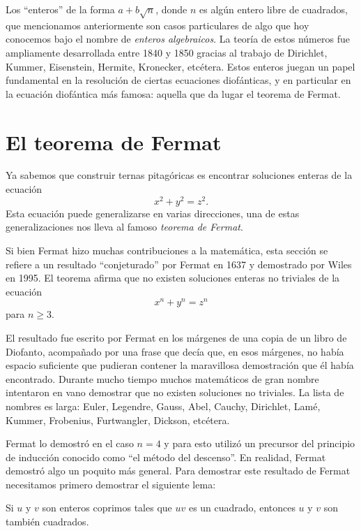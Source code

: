 Los ``enteros'' de la forma $a+b\sqrt{n}$, donde $n$ es algún entero libre de
cuadrados, que mencionamos anteriormente son casos particulares de algo que hoy
conocemos bajo el nombre de \emph{enteros algebraicos}. La teoría de estos
números fue ampliamente desarrollada entre 1840 y 1850 gracias al trabajo de
Dirichlet, Kummer, Eisenstein, Hermite, Kronecker, etcétera. Estos enteros juegan un
papel fundamental en la resolución de ciertas ecuaciones diofánticas, y en
particular en la ecuación diofántica más famosa: aquella que da lugar el
teorema de Fermat.

\section*{El teorema de Fermat}

Ya sabemos que construir ternas pitagóricas es encontrar
soluciones enteras de la ecuación 
\[
	x^2+y^2=z^2.
\]
Esta ecuación puede generalizarse en varias direcciones, una de estas
generalizaciones nos lleva al famoso \emph{teorema de Fermat}.  

Si bien Fermat
hizo muchas contribuciones a la matemática, esta sección se refiere a un
resultado ``conjeturado'' por Fermat en 1637 y demostrado por Wiles en 1995. El
teorema afirma que no existen soluciones enteras no triviales de la ecuación
\[
	x^n+y^n=z^n
\]
para $n\geq3$. 

El resultado fue escrito por Fermat en los márgenes de una copia de un libro de
Diofanto, acompañado por una frase que decía que, en esos márgenes, no había
espacio suficiente que pudieran contener la maravillosa demostración que él
había encontrado.  Durante mucho tiempo muchos matemáticos de gran nombre
intentaron en vano demostrar que no existen soluciones no triviales. La lista
de nombres es larga: Euler, Legendre, Gauss, Abel, Cauchy, Dirichlet, Lamé,
Kummer, Frobenius, Furtwangler, Dickson, etcétera.

Fermat lo demostró en el caso $n=4$ y para esto utilizó un precursor del
principio de inducción conocido como ``el método del descenso''. En realidad,
Fermat demostró algo un poquito más general. Para demostrar este resultado de
Fermat necesitamos primero demostrar el siguiente lema:

\begin{lemma}
	\label{lem:cuadrados}
	Si $u$ y $v$ son enteros coprimos tales que $uv$ es un cuadrado, entonces
	$u$ y $v$ son también cuadrados.
\end{lemma}

